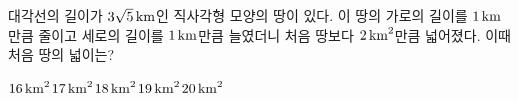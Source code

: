 대각선의 길이가 $3\sqrt{5}\mkern3mu \mathrm{km}$인 직사각형 모양의 땅이 있다. 이 땅의 가로의 길이를 $1\mkern3mu \mathrm{km}$만큼 줄이고 세로의 길이를 $1\mkern3mu \mathrm{km}$만큼 늘였더니 처음 땅보다 $2\mkern3mu \mathrm{km}^2$만큼 넓어졌다. 이때 처음 땅의 넓이는?
\begin{choices32}{$16\mkern3mu \mathrm{km}^2$}{$17\mkern3mu \mathrm{km}^2$}{$18\mkern3mu \mathrm{km}^2$}{$19\mkern3mu \mathrm{km}^2$}{$20\mkern3mu \mathrm{km}^2$}\end{choices32}

